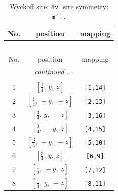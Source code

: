 \documentclass[fleqn,8pt]{jsarticle}
\begin{document}
\begin{longtable}{ccc}
\caption{Wyckoff site: {\tt 8v}, site symmetry: {\tt m'..}}
 \\
 \hline \hline
No. & position & mapping \\ \hline \endfirsthead

\multicolumn{2}{l}{\tablename\ \thetable{}} \\
 \hline \hline
No. & position & mapping \\ \hline \endhead

 \hline \hline
\multicolumn{2}{r}{\footnotesize\it continued ...} \\ \endfoot

 \hline \hline
\multicolumn{2}{r}{} \\ \endlastfoot

1 & $\left[ \frac{1}{4},\, y,\, z \right]$ & {\tt [1,14]} \\ \hline
2 & $\left[ \frac{1}{4},\, - y,\, - z \right]$ & {\tt [2,13]} \\ \hline
3 & $\left[ \frac{3}{4},\, y,\, - z \right]$ & {\tt [3,16]} \\ \hline
4 & $\left[ \frac{3}{4},\, - y,\, z \right]$ & {\tt [4,15]} \\ \hline
5 & $\left[ \frac{3}{4},\, - y,\, - z \right]$ & {\tt [5,10]} \\ \hline
6 & $\left[ \frac{3}{4},\, y,\, z \right]$ & {\tt [6,9]} \\ \hline
7 & $\left[ \frac{1}{4},\, - y,\, z \right]$ & {\tt [7,12]} \\ \hline
8 & $\left[ \frac{1}{4},\, y,\, - z \right]$ & {\tt [8,11]} \\
\end{longtable}
\renewcommand{\arraystretch}{1.2}
\end{document}
